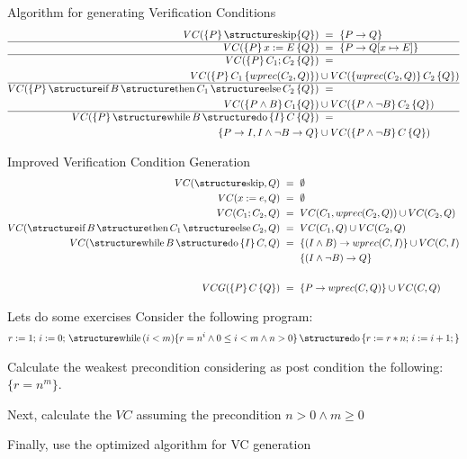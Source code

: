 \documentclass[aspectratio=169]{beamer}
\begin{document}
\begin{slide}{Algorithm for generating Verification Conditions}
 \begin{align*}
 VC(\{P\}\,\kw{skip}\{Q\}) & ~=~ \{P \to Q\} \\\hline
 VC(\{P\}\,x := E\,\{Q\})  & ~=~ \{P \to Q[x \mapsto E]\} \\\hline
 VC(\{P\}\,C_1;C_2\,\{Q\}) & ~=~ \\
 VC(\{P\}\,C_1\,\{wprec(C_2,Q)\}) & \cup VC(\{wprec(C_2,Q)\}\,C_2\,\{Q\})  \\\hline
 VC(\{P\}\,\kw{if}\,B\,\kw{then}\,C_1\,\kw{else}\,C_2\,\{Q\}) & ~=~ \\
VC(\{P \land B\}\,C_1\{Q\}) &\cup VC(\{P \land \neg B\}\,C_2\,\{Q\}) \\\hline
VC(\{P\}\,\kw{while}\,B\,\kw{do}\,\{I\}\,C\,\{Q\}) & ~=~\\
 \{ P \to I , I \land \neg B \to Q\} &\cup VC(\{P \land \neg B\}\,C\,\{Q\}) 
 \end{align*}
\end{slide}

\begin{slide}{Improved Verification Condition Generation}
\begin{align*}
VC(\kw{skip},Q) & ~=~ \emptyset\\
VC(x := e,Q)    & ~=~ \emptyset\\
VC(C_1;C_2,Q)   & ~=~ VC(C_1,wprec(C_2,Q)) \cup VC(C_2,Q)\\
VC(\kw{if}\,B\,\kw{then}\,C_1\,\kw{else}\,C_2,Q) & ~=~ VC(C_1,Q) \cup VC(C_2,Q)\\
VC(\kw{while}\,B\,\kw{do}\,\{I\}\,C,Q) & ~=~ \{ (I \land B) \to wprec(C,I) \} \cup VC(C,I)\\
& \:\:\:\:\:\:\:\:\:\{(I \land \neg B) \to Q\}\\
& \\
VCG(\{P\}\,C\,\{Q\}) & ~=~ \{P \to wprec(C,Q)\} \cup VC(C,Q)
\end{align*}
\end{slide}

\begin{slide}{Lets do some exercises}
Consider the following program: 
\begin{align*}
r := 1;\,
i := 0;\,
\kw{while}\,(i < m)\{r = n^i \land 0 \leq i < m \land n > 0\}\,\kw{do}\,\{
r := r * n;\,
i := i +1;
\}
\end{align*}

Calculate the weakest precondition considering as post condition the following: $\{r = n^m\}$.

Next, calculate the $VC$ assuming the precondition $n > 0 \land m \geq 0$  

Finally, use the optimized algorithm for VC generation
\end{slide}
\end{document}
